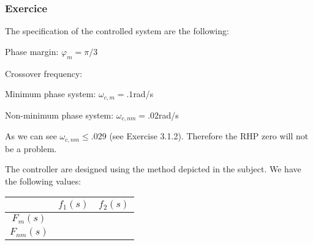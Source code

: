 \subsubsection{Exercice}

The specification of the controlled system are the following:

\begin{shortitemize}
    \item Phase margin: $\varphi_m = \pi/3$
    \item Crossover frequency: 
        \begin{shortitemize}
            \item Minimum phase system: $\omega_{c,m} = .1$rad/s
            \item Non-minimum phase system: $\omega_{c,nm} = .02$rad/s
        \end{shortitemize}
\end{shortitemize}

As we can see $\omega_{c,nm} \leq .029$ (see Exercise 3.1.2). Therefore the RHP zero will not be a problem.

The controller are designed using the method depicted in the subject. 
We have the following values:

\begin{center}
    \begin{tabular}{|c|cc|}
        \hline
        & $f_1(s)$ & $f_2(s)$ \\
        \hline
        $F_{m}(s)$ & & \\
        $F_{nm}(s)$ & & \\
       \hline 
    \end{tabular}
\end{center}

